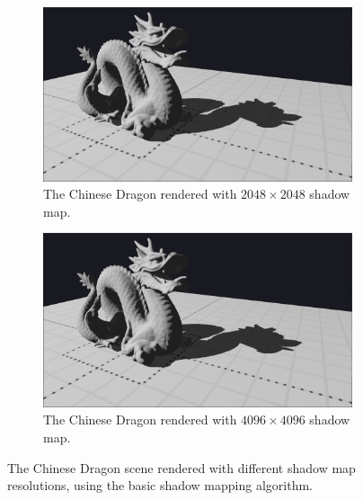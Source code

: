 \begin{figure}
    \begin{subfigure}{0.48\textwidth}
		\centering
        \includegraphics[width=\textwidth]{./graf/tests/basic/cropped/dragon_basic_fhd_2048.png}
        \caption{The Chinese Dragon rendered with \(2048\times 2048\) shadow map.}
    \end{subfigure}
	\hfill
    \begin{subfigure}{0.48\textwidth}
		\centering
        \includegraphics[width=\textwidth]{./graf/tests/basic/cropped/dragon_basic_fhd_4096.png}
        \caption{The Chinese Dragon rendered with \(4096\times 4096\) shadow map.}
    \end{subfigure}

    \caption{The Chinese Dragon scene rendered with different shadow map resolutions, using the basic shadow mapping algorithm.}
    \label{fig:test_basic_dragon_screens}
\end{figure}
